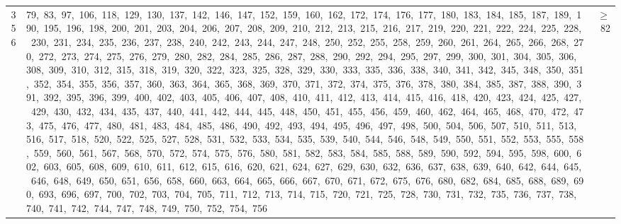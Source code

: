 \begin{longtable}{c|p{}|r}
356 & 79,\ 83,\ 97,\ 106,\ 118,\ 129,\ 130,\ 137,\ 142,\ 146,\ 147,\ 152,\ 159,\ 160,\ 162,\ 172,\ 174,\ 176,\ 177,\ 180,\ 183,\ 184,\ 185,\ 187,\ 189,\ 190,\ 195,\ 196,\ 198,\ 200,\ 201,\ 203,\ 204,\ 206,\ 207,\ 208,\ 209,\ 210,\ 212,\ 213,\ 215,\ 216,\ 217,\ 219,\ 220,\ 221,\ 222,\ 224,\ 225,\ 228,\ 230,\ 231,\ 234,\ 235,\ 236,\ 237,\ 238,\ 240,\ 242,\ 243,\ 244,\ 247,\ 248,\ 250,\ 252,\ 255,\ 258,\ 259,\ 260,\ 261,\ 264,\ 265,\ 266,\ 268,\ 270,\ 272,\ 273,\ 274,\ 275,\ 276,\ 279,\ 280,\ 282,\ 284,\ 285,\ 286,\ 287,\ 288,\ 290,\ 292,\ 294,\ 295,\ 297,\ 299,\ 300,\ 301,\ 304,\ 305,\ 306,\ 308,\ 309,\ 310,\ 312,\ 315,\ 318,\ 319,\ 320,\ 322,\ 323,\ 325,\ 328,\ 329,\ 330,\ 333,\ 335,\ 336,\ 338,\ 340,\ 341,\ 342,\ 345,\ 348,\ 350,\ 351,\ 352,\ 354,\ 355,\ 356,\ 357,\ 360,\ 363,\ 364,\ 365,\ 368,\ 369,\ 370,\ 371,\ 372,\ 374,\ 375,\ 376,\ 378,\ 380,\ 384,\ 385,\ 387,\ 388,\ 390,\ 391,\ 392,\ 395,\ 396,\ 399,\ 400,\ 402,\ 403,\ 405,\ 406,\ 407,\ 408,\ 410,\ 411,\ 412,\ 413,\ 414,\ 415,\ 416,\ 418,\ 420,\ 423,\ 424,\ 425,\ 427,\ 429,\ 430,\ 432,\ 434,\ 435,\ 437,\ 440,\ 441,\ 442,\ 444,\ 445,\ 448,\ 450,\ 451,\ 455,\ 456,\ 459,\ 460,\ 462,\ 464,\ 465,\ 468,\ 470,\ 472,\ 473,\ 475,\ 476,\ 477,\ 480,\ 481,\ 483,\ 484,\ 485,\ 486,\ 490,\ 492,\ 493,\ 494,\ 495,\ 496,\ 497,\ 498,\ 500,\ 504,\ 506,\ 507,\ 510,\ 511,\ 513,\ 516,\ 517,\ 518,\ 520,\ 522,\ 525,\ 527,\ 528,\ 531,\ 532,\ 533,\ 534,\ 535,\ 539,\ 540,\ 544,\ 546,\ 548,\ 549,\ 550,\ 551,\ 552,\ 553,\ 555,\ 558,\ 559,\ 560,\ 561,\ 567,\ 568,\ 570,\ 572,\ 574,\ 575,\ 576,\ 580,\ 581,\ 582,\ 583,\ 584,\ 585,\ 588,\ 589,\ 590,\ 592,\ 594,\ 595,\ 598,\ 600,\ 602,\ 603,\ 605,\ 608,\ 609,\ 610,\ 611,\ 612,\ 615,\ 616,\ 620,\ 621,\ 624,\ 627,\ 629,\ 630,\ 632,\ 636,\ 637,\ 638,\ 639,\ 640,\ 642,\ 644,\ 645,\ 646,\ 648,\ 649,\ 650,\ 651,\ 656,\ 658,\ 660,\ 663,\ 664,\ 665,\ 666,\ 667,\ 670,\ 671,\ 672,\ 675,\ 676,\ 680,\ 682,\ 684,\ 685,\ 688,\ 689,\ 690,\ 693,\ 696,\ 697,\ 700,\ 702,\ 703,\ 704,\ 705,\ 711,\ 712,\ 713,\ 714,\ 715,\ 720,\ 721,\ 725,\ 728,\ 730,\ 731,\ 732,\ 735,\ 736,\ 737,\ 738,\ 740,\ 741,\ 742,\ 744,\ 747,\ 748,\ 749,\ 750,\ 752,\ 754,\ 756 & $\ge$ 82 \\

\end{longtable}
